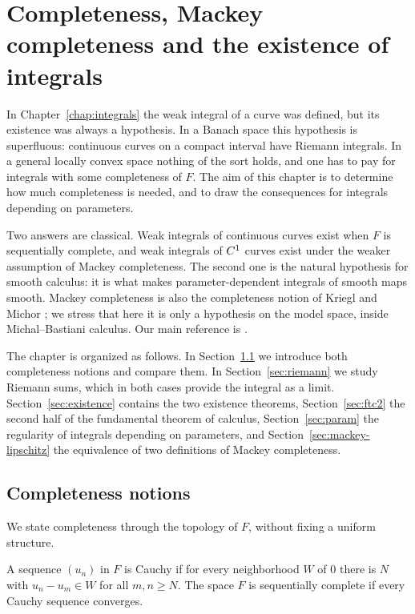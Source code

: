 \chapter{Completeness, Mackey completeness and the existence of integrals}
\label{chap:completeness}

In Chapter~\ref{chap:integrals} the weak integral of a curve was defined, but its existence was
always a hypothesis. In a Banach space this hypothesis is superfluous: continuous curves on a
compact interval have Riemann integrals. In a general locally convex space nothing of the sort
holds, and one has to pay for integrals with some completeness of $F$. The aim of this chapter
is to determine how much completeness is needed, and to draw the consequences for integrals
depending on parameters.

Two answers are classical. Weak integrals of continuous curves exist when $F$ is sequentially
complete, and weak integrals of $C^{1}$ curves exist under the weaker assumption of Mackey
completeness. The second one is the natural hypothesis for smooth calculus: it is what makes
parameter-dependent integrals of smooth maps smooth. Mackey completeness is also the completeness
notion of Kriegl and Michor \cite[\S 2]{KM97}; we stress that here it is only a hypothesis on
the model space, inside Michal--Bastiani calculus. Our main reference is \cite[\S1.1]{GN26}.

The chapter is organized as follows. In Section~\ref{sec:completeness-notions} we introduce
both completeness notions and compare them. In Section~\ref{sec:riemann} we study Riemann sums,
which in both cases provide the integral as a limit. Section~\ref{sec:existence} contains the
two existence theorems, Section~\ref{sec:ftc2} the second half of the fundamental theorem of
calculus, Section~\ref{sec:param} the regularity of integrals depending on parameters, and
Section~\ref{sec:mackey-lipschitz} the equivalence of two definitions of Mackey completeness.

\section{Completeness notions}
\label{sec:completeness-notions}

We state completeness through the topology of $F$, without fixing a uniform structure.

\begin{definition}
  \label{def:seq-complete}
  \leanok
  A sequence $(u_n)$ in $F$ is Cauchy if for every neighborhood $W$ of $0$ there is $N$ with
  $u_n - u_m \in W$ for all $m, n \geq N$. The space $F$ is sequentially complete if every
  Cauchy sequence converges.
\end{definition}

